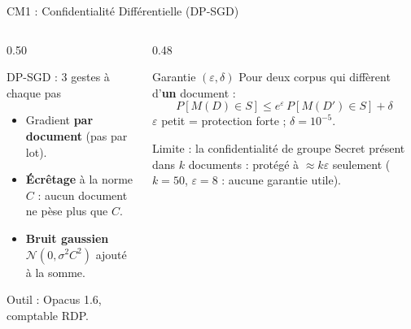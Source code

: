 
\begin{frame}{CM1 : Confidentialité Différentielle (DP-SGD)}
    \begin{columns}[T]
        \begin{column}{0.50\textwidth}
            \begin{block}{DP-SGD : 3 gestes à chaque pas}
                \small
                \begin{itemize}
                    \item[\textbf{1.}] Gradient \textbf{par document} (pas par lot).
                    \item[\textbf{2.}] \textbf{Écrêtage} à la norme $C$ : aucun document ne pèse plus que $C$.
                    \item[\textbf{3.}] \textbf{Bruit gaussien} $\mathcal{N}(0, \sigma^2 C^2)$ ajouté à la somme.
                \end{itemize}
                Outil : Opacus 1.6, comptable RDP.
            \end{block}
        \end{column}
        \begin{column}{0.48\textwidth}
            \begin{block}{Garantie $(\varepsilon, \delta)$}
                \small
                Pour deux corpus qui diffèrent d'\textbf{un} document :
                $$P[M(D) \in S] \le e^{\varepsilon}\, P[M(D') \in S] + \delta$$
                {\footnotesize $\varepsilon$ petit = protection forte ; $\delta = 10^{-5}$.}
            \end{block}
            \begin{alertblock}{Limite : la confidentialité de groupe}
                \footnotesize Secret présent dans $k$ documents : protégé à $\approx k\varepsilon$ seulement ($k = 50$, $\varepsilon = 8$ : aucune garantie utile).
            \end{alertblock}
        \end{column}
    \end{columns}
\end{frame}


